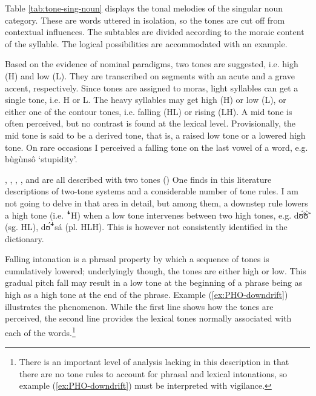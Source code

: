 Table \ref{tab:tone-sing-noun} displays  the tonal melodies of the singular noun category.  These are words uttered in isolation, so the tones are cut off from contextual influences. The subtables are divided according to the moraic content of the syllable. The  logical possibilities are accommodated with an example.



Based on the evidence of nominal paradigms,  two tones are suggested, i.e. high (H) and low (L). They are transcribed on segments with an acute and a grave  accent, respectively. Since tones are assigned to moras, light syllables can get a single tone, i.e. H or L. The heavy syllables may get high (H) or low (L), or either one of the contour tones, i.e. falling (HL) or rising (LH). A mid tone is often perceived, but no contrast is found  at the lexical level. Provisionally,  the mid tone is said to be a derived tone, that is, a raised low tone  or a lowered high tone. On rare occasions I  perceived a falling tone on the last vowel of a word, e.g. {\sls  bùgùnsô} `stupidity'.


, , , ,  and  are all described with two tones (\citealt{Rowl65, Crou66, Gray69,  Toup95, Crou03})  One finds in this literature descriptions of two-tone systems and a considerable number of tone rules. I am not going to delve in that area in detail, but among them,  a downstep rule lowers a high tone (i.e. {\T ꜜ}H)  when a low tone intervenes between two high tones, e.g. {\sls dʊ̃́ʊ̃̀} ({\sc sg.} HL), {\sls dʊ̃́{\T ꜜ}sá} ({\sc pl.} HLH).  This is however not consistently identified in the dictionary.



\largerpage[2]
Falling intonation is a phrasal property by which a sequence of tones is cumulatively lowered; underlyingly though, the tones are either high or low. This gradual pitch fall may result in a low tone at the beginning of a phrase being as high as a high tone at the end of the phrase. Example (\ref{ex:PHO-downdrift}) illustrates the phenomenon. While the first line shows how the tones are perceived, the second line provides the lexical  tones normally associated with each of the words.\footnote{There is an important level of analysis lacking in this description in that there are no tone rules to account for phrasal and lexical intonations, so example (\ref{ex:PHO-downdrift}) must be interpreted with vigilance.}

